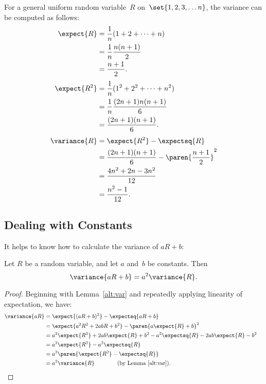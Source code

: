 For a general uniform random variable~$R$ on~$\set{1, 2, 3, \dots n}$,
the variance can be computed as follows:
\begin{align*}
\expect{R}
    &= \frac{1}{n} (1 + 2 + \dots + n) \\
    &= \frac{1}{n} \frac{n (n + 1)}{2} \\
    &= \frac{n + 1}{2}. \\[\jot]
%
\expect{R^2}
    &= \frac{1}{n} (1^2 + 2^2 + \dots + n^2) \\
    &= \frac{1}{n} \frac{(2n + 1) n (n + 1)}{6} \\
    &= \frac{(2n + 1) (n + 1)}{6}. \\[\jot]
%
\variance{R}
    &= \expect{R^2} - \expectsq{R} \\
    &= \frac{(2n + 1) (n + 1)}{6} - \paren{\frac{n + 1}{2}}^2 \\
    &= \frac{4n^2 + 2n - 3n^2}{12} \\
    &= \frac{n^2 - 1}{12}.
\end{align*}

\subsection{Dealing with Constants}

It helps to know how to calculate the variance of $a R + b$:

\begin{theorem}\label{var.const}\label{var+const}\label{thm:var(aR+b)}
Let $R$ be a random variable, and let $a$ and~$b$ be constants. Then
\begin{equation}\label{a2R}
    \variance{a R + b} = a^2 \variance{R}.
\end{equation}
\end{theorem}

\begin{proof}
Beginning with Lemma~\ref{alt:var} and repeatedly applying linearity
of expectation, we have:
\begin{align*}
\variance{aR}
    &= \expect{(a R + b)^2} - \expectsq{a R + b} \\
    &= \expect{a^2 R^2 + 2 a b R + b^2}
            - \paren{a \expect{R} + b}^2 \\
    &= a^2 \expect{R^2} + 2 a b \expect{R} + b^2
        - a^2 \expectsq{R} - 2 a b \expect{R} - b^2 \\
    & = a^2\expect{R^2} -a^2\expectsq{R}\\
    & = a^2\paren{\expect{R^2} - \expectsq{R}}\\
    & = a^2\variance{R} \qquad\qquad \text{(by Lemma~\ref{alt:var})}. & \qedhere
\end{align*}
\end{proof}

